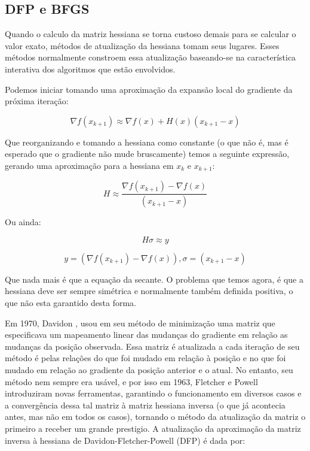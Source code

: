 \subsection{DFP e BFGS}
Quando o calculo da matriz hessiana se torna custoso demais para se calcular o valor exato,
métodos de atualização da hessiana tomam seus lugares. Esses métodos normalmente constroem
essa atualização baseando-se na característica interativa dos algoritmos que estão envolvidos.

Podemos iniciar tomando uma aproximação da expansão local do gradiente da próxima iteração:

\begin{equation}
\nabla f(x_{k+1}) \approx \nabla f(x) + H(x) (x_{k+1} - x)
\end{equation}

Que reorganizando e tomando a hessiana como constante (o que não é, mas é esperado que o gradiente
não mude bruscamente) temos a seguinte expressão, gerando uma aproximação para a hessiana em \(x_k\)
e \(x_{k+1}\):

\begin{equation}
H \approx \frac{\nabla f(x_{k+1}) - \nabla f(x)}{(x_{k+1} - x)}
\end{equation}

Ou ainda:

\begin{equation}
H\sigma \approx y
\end{equation}

\begin{equation}
y = (\nabla f(x_{k+1}) - \nabla f(x)), \sigma = (x_{k+1} - x)
\end{equation}


Que nada mais é que a equação da secante. O problema que temos agora, é que a hessiana deve ser
sempre simétrica e normalmente também definida positiva, o que não esta garantido desta forma.

Em 1970, Davidon \cite{davidon1991variable}, usou em seu método de minimização uma matriz que
especificava um mapeamento linear das mudanças do gradiente em relação as mudanças da posição
observada. Essa matriz é atualizada a cada iteração de seu método é pelas relações do que foi
mudado em relação à posição e no que foi mudado em relação ao gradiente da posição anterior
e o atual. No entanto, seu método nem sempre era usável, e por isso em 1963, Fletcher e Powell
\cite{fletcher1963rapidly} introduziram novas ferramentas, garantindo o funcionamento em diversos
casos e a convergência dessa tal matriz à matriz hessiana inversa (o que já acontecia antes, mas
não em todos os casos), tornando o método da atualização da matriz o primeiro a receber um grande
prestigio. A atualização da aproximação da matriz inversa à hessiana de Davidon-Fletcher-Powell
(DFP) é dada por:

